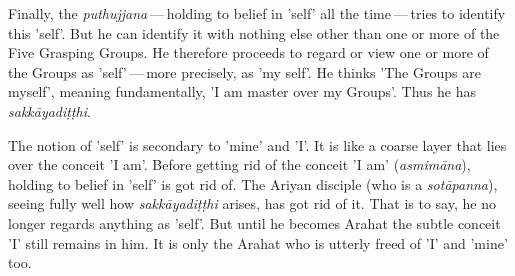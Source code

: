 Finally, the \emph{puthujjana} --- holding to belief in 'self' all the time --- tries to identify this 'self'. But he can identify it with nothing else other than one or more of the Five Grasping Groups. He therefore proceeds to regard or view one or more of the Groups as 'self' --- more precisely, as 'my self'. He thinks 'The Groups are myself', meaning fundamentally, 'I am master over my Groups'. Thus he has \emph{sakkāyadiṭṭhi}.

The notion of 'self' is secondary to 'mine' and 'I'. It is like a coarse layer that lies over the conceit 'I am'. Before getting rid of the conceit 'I am' (\emph{asmimāna}), holding to belief in 'self' is got rid of. The Ariyan disciple (who is a \emph{sotāpanna}), seeing fully well how \emph{sakkāyadiṭṭhi} arises, has got rid of it. That is to say, he no longer regards anything as 'self'. But until he becomes Arahat the subtle conceit 'I' still remains in him. It is only the Arahat who is utterly freed of 'I' and 'mine' too.
